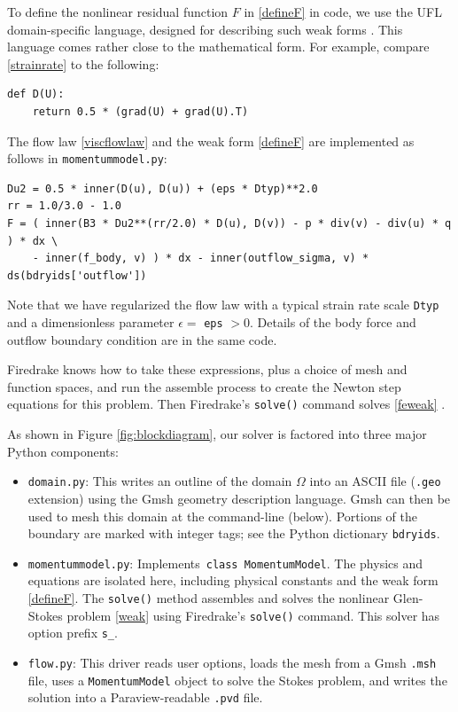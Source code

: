 \documentclass[letterpaper,final,12pt,reqno]{amsart}
\newcommand{\eps}{\epsilon}
\begin{document}
To define the nonlinear residual function $F$ in \eqref{defineF} in code, we use the UFL domain-specific language, designed for describing such weak forms \cite{Alnaesetal2014}.  This language comes rather close to the mathematical form.  For example, compare \eqref{strainrate} to the following:
\begin{Verbatim}[fontsize=\small,frame=lines]
def D(U):
    return 0.5 * (grad(U) + grad(U).T)
\end{Verbatim}
The flow law \eqref{viscflowlaw} and the weak form \eqref{defineF} are implemented as follows in \texttt{momentummodel.py}:
\begin{Verbatim}[fontsize=\small,frame=lines]
Du2 = 0.5 * inner(D(u), D(u)) + (eps * Dtyp)**2.0
rr = 1.0/3.0 - 1.0
F = ( inner(B3 * Du2**(rr/2.0) * D(u), D(v)) - p * div(v) - div(u) * q ) * dx \
    - inner(f_body, v) ) * dx - inner(outflow_sigma, v) * ds(bdryids['outflow'])
\end{Verbatim}
Note that we have regularized the flow law with a typical strain rate scale \texttt{Dtyp} and a dimensionless parameter $\eps=$ \texttt{eps} $>0$.  Details of the body force and outflow boundary condition are in the same code.

Firedrake knows how to take these expressions, plus a choice of mesh and function spaces, and run the assemble process to create the Newton step equations for this problem.  Then Firedrake's \texttt{solve()} command solves \eqref{feweak} \cite{Rathgeberetal2016}.

As shown in Figure \ref{fig:blockdiagram}, our solver is factored into three major Python components:
\begin{itemize}
\item \texttt{domain.py}: \quad  This writes an outline of the domain $\Omega$ into an ASCII file (\texttt{.geo} extension) using the Gmsh \cite{GeuzaineRemacle2009} geometry description language.  Gmsh can then be used to mesh this domain at the command-line (below).  Portions of the boundary are marked with integer tags; see the Python dictionary \texttt{bdryids}.

\item \texttt{momentummodel.py}: \quad  Implements\, \texttt{class MomentumModel}.  The physics and equations are isolated here, including physical constants and the weak form \eqref{defineF}.  The \texttt{solve()} method assembles and solves the nonlinear Glen-Stokes problem \eqref{weak} using Firedrake's \texttt{solve()} command.  This solver has option prefix \texttt{s\_}.

\item \texttt{flow.py}: \quad  This driver reads user options, loads the mesh from a Gmsh \texttt{.msh} file, uses a \texttt{MomentumModel} object to solve the Stokes problem, and writes the solution into a Paraview-readable \texttt{.pvd} file.
\end{itemize}
\end{document}
